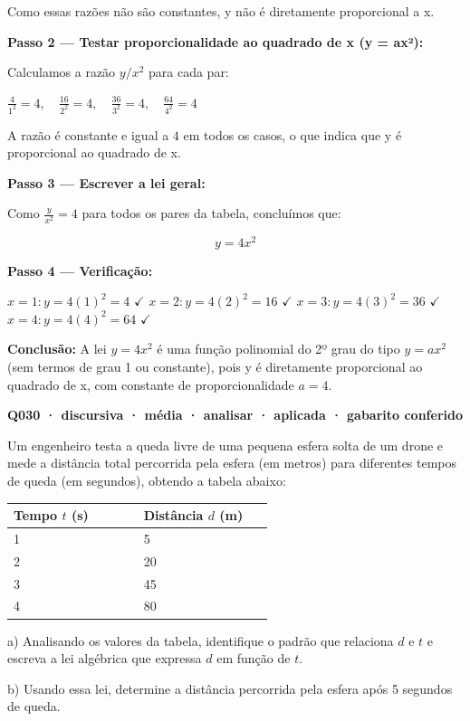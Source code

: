 \documentclass[11pt,a4paper]{article}
\begin{document}
Como essas razões não são constantes, y não é diretamente proporcional a x.

\textbf{Passo 2 — Testar proporcionalidade ao quadrado de x (y = ax²):}

Calculamos a razão $y/x^2$ para cada par:

$\frac{4}{1^2}=4,\quad \frac{16}{2^2}=4,\quad \frac{36}{3^2}=4,\quad \frac{64}{4^2}=4$

A razão é constante e igual a $4$ em todos os casos, o que indica que y é proporcional ao quadrado de x.

\textbf{Passo 3 — Escrever a lei geral:}

Como $\frac{y}{x^2}=4$ para todos os pares da tabela, concluímos que:

$$y = 4x^2$$

\textbf{Passo 4 — Verificação:}

$x=1: y=4(1)^2=4$ $\checkmark$
$x=2: y=4(2)^2=16$ $\checkmark$
$x=3: y=4(3)^2=36$ $\checkmark$
$x=4: y=4(4)^2=64$ $\checkmark$

\textbf{Conclusão:} A lei $y=4x^2$ é uma função polinomial do 2º grau do tipo $y=ax^2$ (sem termos de grau 1 ou constante), pois y é diretamente proporcional ao quadrado de x, com constante de proporcionalidade $a=4$.

\bigskip\noindent\textbf{Q030 · discursiva · média · analisar · aplicada · gabarito conferido}\par\nopagebreak
Um engenheiro testa a queda livre de uma pequena esfera solta de um drone e mede a distância total percorrida pela esfera (em metros) para diferentes tempos de queda (em segundos), obtendo a tabela abaixo:

\begin{center}
\begin{tabular}{|p{0.430\linewidth}|p{0.430\linewidth}|}
\hline
\textbf{Tempo $t$ (s)} & \textbf{Distância $d$ (m)} \\
\hline
1 & 5 \\
\hline
2 & 20 \\
\hline
3 & 45 \\
\hline
4 & 80 \\
\hline
\end{tabular}
\end{center}

a) Analisando os valores da tabela, identifique o padrão que relaciona $d$ e $t$ e escreva a lei algébrica que expressa $d$ em função de $t$.

b) Usando essa lei, determine a distância percorrida pela esfera após 5 segundos de queda.
\end{document}
